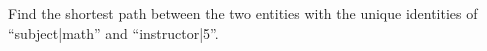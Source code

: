 		\begin{ex}
			Find the shortest path between the two entities with the unique identities of ``subject|math'' and ``instructor|5''.
			
			
		\end{ex}
		
		
		
		
		
		
		
		
		
		
		
		
		
		